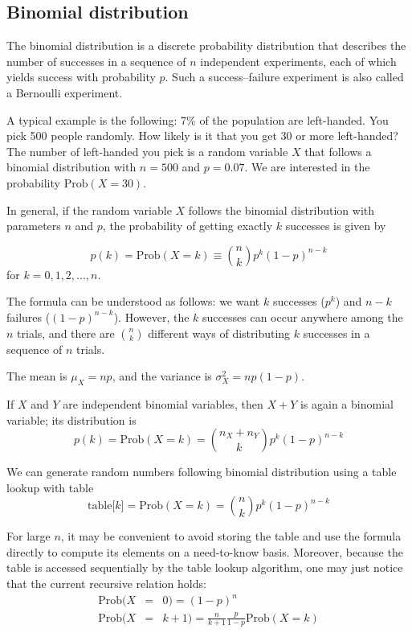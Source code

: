\documentclass[justified, sixbynine]{tufte-book}
\theoremstyle{plain}%
\newtheorem * {corollary}{Corollary}
\theoremstyle{definition}
\theoremstyle{remark}
\newtheorem * {remark}{Remark}
\newtheorem * {note}{Note}
\begin{document}
\begin{fullwidth}
\goodbreak\subsection{Binomial distribution}


The binomial distribution is a discrete probability distribution that
describes the number of successes in a sequence of $n$ independent
experiments, each of which yields success with probability $p$. Such a
success--failure experiment is also called a Bernoulli experiment.

A typical example is the following: 7\% of the population are left-handed.
You pick 500 people randomly. How likely is it that you get 30 or more
left-handed? The number of left-handed you pick is a random variable $X$
that follows a binomial distribution with $n=500$ and $p=0.07$. We are
interested in the probability $\textrm{Prob}(X=30)$.

In general, if the random variable $X$ follows the binomial distribution with
parameters $n$ and $p$, the probability of getting exactly $k$ successes is
given by

\begin{equation}
p(k)=\textrm{Prob}(X=k) \equiv  \binom nkp^k(1-p)^{n-k}
\end{equation}
for $k=0, 1, 2, ..., n$.

The formula can be understood as follows: we want $k$ successes ($p^k$) and $%
n-k$ failures ($(1-p)^{n-k}$). However, the $k$ successes can occur anywhere
among the $n$ trials, and there are $\binom nk$ different ways of distributing
$k$ successes in a sequence of $n$ trials.

The mean is $\mu _X=np$, and the variance is $\sigma _X^2=np(1-p)$.

If $X$ and $Y$ are independent binomial variables, then $X+Y$ is again a
binomial variable; its distribution is
\begin{equation}
p(k)=\textrm{Prob}(X=k)=\binom{n_X+n_Y}kp^k(1-p)^{n-k}
\end{equation}

We can generate random numbers following binomial distribution using a table lookup with table
\begin{equation}
\text{table[}k\text{]}=\textrm{Prob}(X=k)=\binom nkp^k(1-p)^{n-k}
\end{equation}

For large $n$, it may be convenient to avoid storing the table and use the
formula directly to compute its elements on a need-to-know basis.
Moreover, because the table is accessed sequentially by the
table lookup algorithm, one may just notice that the current recursive relation holds:
\begin{eqnarray}
\textrm{Prob}(X &=&0)=(1-p)^n \\
\textrm{Prob}(X &=&k+1)=\frac n{k+1}\frac p{1-p}\textrm{Prob}(X=k)
\end{eqnarray}


\end{fullwidth}
\end{document}

